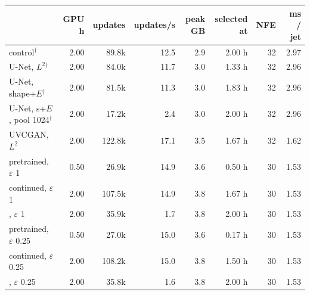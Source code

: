 \scriptsize
\setlength{\tabcolsep}{3pt}
\begin{tabular}{lrrrrrrr}
\toprule
 & GPU h & updates & updates/s & peak GB & selected at & NFE & ms / jet \\
\midrule
\pai{} control$^\dagger$ & 2.00 & 89.8k & 12.5 & 2.9 & 2.00 h & 32 & 2.97 \\
\ot{} U-Net, $L^2$$^\dagger$ & 2.00 & 84.0k & 11.7 & 3.0 & 1.33 h & 32 & 2.96 \\
\ot{} U-Net, shape+$E$$^\dagger$ & 2.00 & 81.5k & 11.3 & 3.0 & 1.83 h & 32 & 2.96 \\
\ot{} U-Net, s+$E$, pool 1024$^\dagger$ & 2.00 & 17.2k & 2.4 & 3.0 & 2.00 h & 32 & 2.96 \\
\ot{} UVCGAN, $L^2$ & 2.00 & 122.8k & 17.1 & 3.5 & 1.67 h & 32 & 1.62 \\
\br{} pretrained, $\varepsilon$ 1 & 0.50 & 26.9k & 14.9 & 3.6 & 0.50 h & 30 & 1.53 \\
\br{} continued, $\varepsilon$ 1 & 2.00 & 107.5k & 14.9 & 3.8 & 1.67 h & 30 & 1.53 \\
\dsbm{}, $\varepsilon$ 1 & 2.00 & 35.9k & 1.7 & 3.8 & 2.00 h & 30 & 1.53 \\
\br{} pretrained, $\varepsilon$ 0.25 & 0.50 & 27.0k & 15.0 & 3.6 & 0.17 h & 30 & 1.53 \\
\br{} continued, $\varepsilon$ 0.25 & 2.00 & 108.2k & 15.0 & 3.8 & 1.50 h & 30 & 1.53 \\
\dsbm{}, $\varepsilon$ 0.25 & 2.00 & 35.8k & 1.6 & 3.8 & 2.00 h & 30 & 1.53 \\
\bottomrule
\end{tabular}
